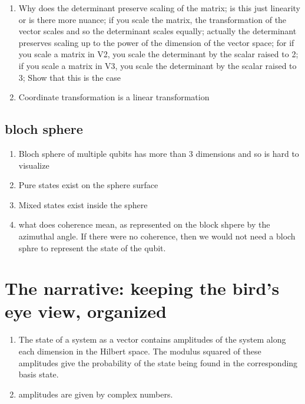 \documentclass[a4paper,12pt]{amsbook}
\newcommand{\0}{{$|0\rangle$}}
\newcommand{\1}{{$|1\rangle$}}
\begin{document}
\begin{enumerate}
    \item Why does the determinant preserve scaling of the matrix; is this just linearity or is there more nuance; if you scale the matrix, the transformation of the vector scales and so the determinant scales equally; actually the determinant preserves scaling up to the power of the dimension of the vector space; for if you scale a matrix in V2, you scale the determinant by the scalar raised to 2; if you scale a matrix in V3, you scale the determinant by the scalar raised to 3; Show that this is the case
    \item Coordinate transformation is a linear transformation
\end{enumerate}

\section{bloch sphere}
\begin{enumerate}
    \item Bloch sphere of multiple qubits has more than 3 dimensions and so is hard to visualize
    \item Pure states exist on the sphere surface
    \item Mixed states exist inside the sphere
    \item what does coherence mean, as represented on the block shpere by the azimuthal angle. If there were no coherence, then we would not need a bloch sphre to represent the state of the qubit. 
\end{enumerate}
\chapter{The narrative: keeping the bird's eye view, organized}
\begin{enumerate}
    \item The state of a system as a vector contains amplitudes of the system along each dimension in the Hilbert space. The modulus squared of these amplitudes give the probability of the state being found in the corresponding basis state.
    \item amplitudes are given by complex numbers. 
\end{enumerate}
\end{document}
